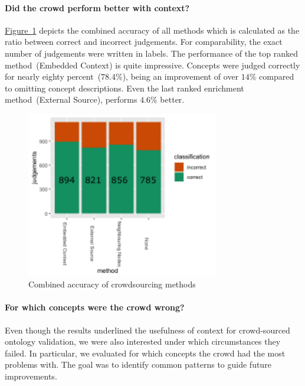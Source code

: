 \paragraph{Did the crowd perform better with context?}
\hyperref[fig:results_accuracy_combined]{Figure~\ref*{fig:results_accuracy_combined}} depicts the combined accuracy of all methods which is calculated
as the ratio between correct and incorrect judgements. For comparability, the exact number of judgements were written in labels. The performance of the top ranked method~(Embedded Context) is quite impressive. Concepts were judged correctly for nearly eighty percent~($78.4\%$), being an improvement of over $14\%$ compared to omitting concept descriptions. Even the last ranked enrichment method~(External Source), performs $4.6\%$ better.
\begin{figure}
	 \centering
	 \includegraphics[width=0.75\textwidth]{plots/comparison/barplot_all_judgements}
	 \caption{Combined accuracy of crowdsourcing methods}\label{fig:results_accuracy_combined}
\end{figure}

\paragraph{For which concepts were the crowd wrong?}
Even though the results underlined the usefulness of context for crowd-sourced ontology validation, we were also interested under which circumstances they failed. In particular, we evaluated for which concepts the crowd had the most problems with. The goal was to identify common patterns to guide future improvements. 

